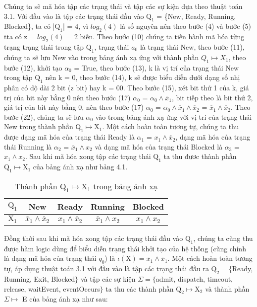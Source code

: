 \documentclass[a4paper,13pt,oneside,openany]{book}
\begin{document}
\begin{flushleft}
	Chúng ta sẽ mã hóa tập các trạng thái và tập các sự kiện dựa theo thuật toán 3.1. Với đầu vào là tập các trạng thái đầu vào $\textrm{Q}_1$ = \{New, Ready, Running,\\Blocked\}, ta có |$\textrm{Q}_1$| = 4, vì $log_2(4)$ là số nguyên nên theo bước (4) và bước (5) tta có z = $log_2(4)$ = 2 biến. Theo bước (10) chúng ta tiến hành mã hóa từng trạng trạng thái trong tập $\textrm{Q}_1$, trạng thái $a_0$ là trạng thái New, theo bước (11), chúng ta sẽ lưu New vào trong bảng ánh xạ ứng với thành phần $Q_1 \mapsto X_1$, theo bước (12), khởi tạo $\alpha_0$ = True, theo bước (13), k là vị trí của trạng thái New trong tập $\textrm{Q}_1$ nên k = 0, theo bước (14), k sẽ được biểu diễn dưới dạng số nhị phân có dộ dài 2 bit (z bit) hay k = 00. Theo bước (15), xét bit thứ 1 của k, giá trị của bit này bằng 0 nên theo bước (17) $\alpha_0$ = $\alpha_0 \land \overline{x}_1$, bit tiếp theo là bit thứ 2, giá trị của bit này bằng 0, nên theo bước (17) $\alpha_0$ = $\alpha_0 \land \overline{x}_1 \land \overline{x}_2$ = $ \overline{x}_1 \land \overline{x}_2$. Theo bước (22), chúng ta sẽ lưu $\alpha_0$ vào trong bảng ánh xạ ứng với vị trí của trạng thái New trong thành phần $\textrm{Q}_1 \mapsto \textrm{X}_1$. Một cách hoàn toàn tương tự, chúng ta thu được dạng mã hóa của trạng thái Ready là $\alpha_1$ = $x_1 \land \overline{x}_2$, dạng mã hóa của trạng thái Running là $\alpha_2$ = $\overline{x}_1 \land x_2$ và dạng mã hóa của trạng thái Blocked là $\alpha_3$ = $x_1 \land x_2$. Sau khi mã hóa xong tập các trạng thái $\textrm{Q}_1$ ta thu đươc thành phần $\textrm{Q}_1 \mapsto \textrm{X}_1$ của bảng ánh xạ như bảng 4.1.
	\begin{table}[!ht]
		\centering
		\renewcommand{\arraystretch}{1.25}
		\begin{tabular}{|c|c|c|c|c|}
			\hline
			$\textrm{Q}_1$ & New & Ready & Running & Blocked\\
			\hline
			$\textrm{X}_1$ & $\overline{x}_1 \land \overline{x}_2$ & $x_1\land\overline{x}_2$&$\overline{x}_1\land x_2$ &
			$x_1 \land x_2$\\
			\hline
		\end{tabular}
		\caption{Thành phần $\textrm{Q}_1 \mapsto \textrm{X}_1$ trong bảng ánh xạ}
	\end{table}
	\noindent
	Đồng thời sau khi mã hóa xong tập các trạng thái đầu vào $\textrm{Q}_1$, chúng ta cũng thu được hàm logic dùng để biểu diễn trạng thái khởi tạo của hệ thống (cũng chính là dạng mã hóa của trạng thái $q_0$) là $\iota(\textrm{X}) = \overline{x}_1 \land \overline{x}_1$. Một cách hoàn toàn tương tự, áp dụng thuật toán 3.1 với đầu vào là tập các trạng thái đầu ra $\textrm{Q}_2 = \{$Ready, Running, Exit, Blocked$\}$ và tập các sự kiện $\Sigma = \{$admit, dispatch, timeout, release, waitEvent, eventOccurs$\}$ ta thu các thành phần $\textrm{Q}_2 \mapsto \textrm{X}_2$ và thành phần $\Sigma \mapsto$ E của bảng ánh xạ như sau:
	

\end{flushleft}
\end{document}
